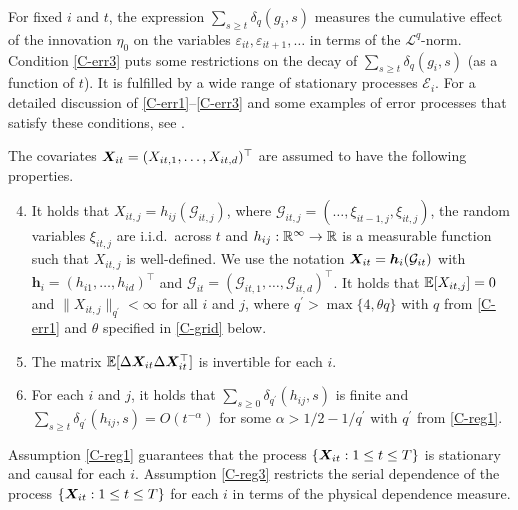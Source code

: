\documentclass[12pt]{article}
\begin{document}
For fixed $i$ and $t$, the expression $\sum\nolimits_{s \ge t} \delta_q(g_i, s)$ measures the cumulative effect of the innovation $\eta_0$ on the variables $\varepsilon_{it}, \varepsilon_{it+1},\ldots$ in terms of the $\mathcal{L}^q$-norm. Condition \ref{C-err3} puts some restrictions on the decay of $\sum\nolimits_{s \ge t} \delta_q(g_i, s)$ (as a function of $t$). It is fulfilled by a wide range of stationary processes $\mathcal{E}_i$. For a detailed discussion of \ref{C-err1}--\ref{C-err3} and some examples of error processes that satisfy these conditions, see \cite{KhismatullinaVogt2020}.


The covariates $\boldsymbol{X}_{it} = (X_{it,1},\ldots, X_{it, d})^\top$ are assumed to have the following properties. 
\begin{enumerate}[label=(C\arabic*),leftmargin=1.05cm, itemsep=0pt, parsep=0pt, topsep=3pt]
\setcounter{enumi}{3}
\item \label{C-reg1} It holds that $X_{it, j} = h_{ij}(\mathcal{G}_{it, j})$, where $\mathcal{G}_{it, j} = (\ldots, \xi_{it-1,j}, \xi_{it, j})$, the random variables $\xi_{it, j}$ are i.i.d.\ across $t$ and $h_{ij}: \mathbb{R}^\infty \rightarrow \mathbb{R}$ is a measurable function such that $X_{it, j}$ is well-defined. We use the notation $\boldsymbol{X}_{it} = \boldsymbol{h}_{i}(\mathcal{G}_{it})$ with $\boldsymbol{h}_i = (h_{i1}, \ldots, h_{id})^\top$ and $\mathcal{G}_{it} = (\mathcal{G}_{it,1}, \ldots, \mathcal{G}_{it, d})^\top$. It holds that $\mathbb{E} [X_{it, j}]=0$ and $\| X_{it, j} \|_{q^\prime} <\infty$ for all $i$ and $j$, where $q^\prime > \max \{ 4, \theta q \}$ with $q$ from \ref{C-err1} and $\theta$ specified in \ref{C-grid} below.
\item \label{C-reg2} The matrix $\mathbb{E}[\Delta \boldsymbol{X}_{it} \Delta \boldsymbol{X}_{it}^\top]$ is invertible for each $i$.
\item \label{C-reg3} For each $i$ and $j$, it holds that $\sum_{s \ge 0} \delta_{q^\prime}(h_{ij}, s)$ is finite and $\sum_{s \ge t} \delta_{q^\prime}(h_{ij}, s)= O(t^{-\alpha})$ for some $\alpha > 1/2 - 1/{q^\prime}$ with $q^\prime$ from \ref{C-reg1}.
\end{enumerate}
Assumption \ref{C-reg1} guarantees that the process $\{ \boldsymbol{X}_{it}: 1 \le t \le T \}$ is stationary and causal for each $i$. Assumption \ref{C-reg3} restricts the serial dependence of the process $\{ \boldsymbol{X}_{it}: 1 \le t \le T \}$ for each $i$ in terms of the physical dependence measure.
\end{document}
